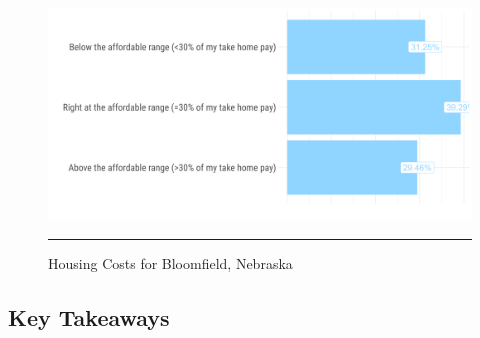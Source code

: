 \begin{figure}[H]
\centering
\begin{framed}
    \caption{Housing Costs for Bloomfield, Nebraska}
    \label{fig:housingCostsSurvey}
    \includegraphics[width=\linewidth]{figures/survey_respondent_housing_costs.png}
    \rule[-5pt]{\linewidth}{0.4pt}
\end{framed}
\end{figure}

\pagebreak
\subsection*{Key Takeaways}